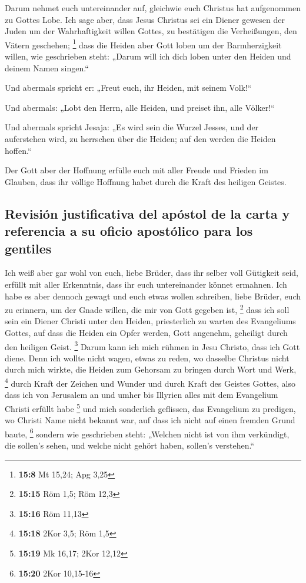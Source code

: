 Darum nehmet euch untereinander auf, gleichwie euch
Christus hat aufgenommen zu Gottes Lobe.  Ich sage aber,
dass Jesus Christus sei ein Diener gewesen der Juden um der
Wahrhaftigkeit willen Gottes, zu bestätigen die Verheißungen, den Vätern
geschehen; \footnote{\textbf{15:8} Mt 15,24; Apg 3,25} 
dass die Heiden aber Gott loben um der Barmherzigkeit willen, wie
geschrieben steht: „Darum will ich dich loben unter den Heiden und
deinem Namen singen.``

 Und abermals spricht er: „Freut euch, ihr Heiden, mit
seinem Volk!{}``

 Und abermals: „Lobt den Herrn, alle Heiden, und preiset
ihn, alle Völker!{}``

 Und abermals spricht Jesaja: „Es wird sein die Wurzel
Jesses, und der auferstehen wird, zu herrschen über die Heiden; auf den
werden die Heiden hoffen.``

 Der Gott aber der Hoffnung erfülle euch mit aller Freude
und Frieden im Glauben, dass ihr völlige Hoffnung habet durch die Kraft
des heiligen Geistes.

\hypertarget{revisiuxf3n-justificativa-del-apuxf3stol-de-la-carta-y-referencia-a-su-oficio-apostuxf3lico-para-los-gentiles}{%
\subsection{Revisión justificativa del apóstol de la carta y referencia
a su oficio apostólico para los
gentiles}\label{revisiuxf3n-justificativa-del-apuxf3stol-de-la-carta-y-referencia-a-su-oficio-apostuxf3lico-para-los-gentiles}}

 Ich weiß aber gar wohl von euch, liebe Brüder, dass ihr
selber voll Gütigkeit seid, erfüllt mit aller Erkenntnis, dass ihr euch
untereinander könnet ermahnen.  Ich habe es aber dennoch
gewagt und euch etwas wollen schreiben, liebe Brüder, euch zu erinnern,
um der Gnade willen, die mir von Gott gegeben ist, \footnote{\textbf{15:15}
  Röm 1,5; Röm 12,3}  dass ich soll sein ein Diener
Christi unter den Heiden, priesterlich zu warten des Evangeliums Gottes,
auf dass die Heiden ein Opfer werden, Gott angenehm, geheiligt durch den
heiligen Geist. \footnote{\textbf{15:16} Röm 11,13} 
Darum kann ich mich rühmen in Jesu Christo, dass ich Gott diene.
 Denn ich wollte nicht wagen, etwas zu reden, wo dasselbe
Christus nicht durch mich wirkte, die Heiden zum Gehorsam zu bringen
durch Wort und Werk, \footnote{\textbf{15:18} 2Kor 3,5; Röm 1,5}
 durch Kraft der Zeichen und Wunder und durch Kraft des
Geistes Gottes, also dass ich von Jerusalem an und umher bis Illyrien
alles mit dem Evangelium Christi erfüllt habe \footnote{\textbf{15:19}
  Mk 16,17; 2Kor 12,12}  und mich sonderlich geflissen,
das Evangelium zu predigen, wo Christi Name nicht bekannt war, auf dass
ich nicht auf einen fremden Grund baute, \footnote{\textbf{15:20} 2Kor
  10,15-16}  sondern wie geschrieben steht: „Welchen
nicht ist von ihm verkündigt, die sollen's sehen, und welche nicht
gehört haben, sollen's verstehen.``

